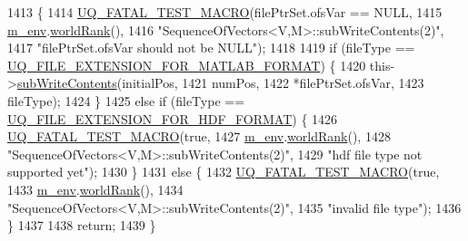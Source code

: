 \begin{DoxyCode}
1413 \{
1414   \hyperlink{_defines_8h_a56d63d18d0a6d45757de47fcc06f574d}{UQ\_FATAL\_TEST\_MACRO}(filePtrSet.ofsVar == NULL,
1415                       \hyperlink{class_q_u_e_s_o_1_1_base_vector_sequence_a8e8824d2a63c5a43bcc6473e3a0491e8}{m\_env}.\hyperlink{class_q_u_e_s_o_1_1_base_environment_a78b57112bbd0e6dd0e8afec00b40ffa7}{worldRank}(),
1416                       \textcolor{stringliteral}{"SequenceOfVectors<V,M>::subWriteContents(2)"},
1417                       \textcolor{stringliteral}{"filePtrSet.ofsVar should not be NULL"});
1418 
1419   \textcolor{keywordflow}{if} (fileType == \hyperlink{_defines_8h_ac440026eff7deb1c1eed1eea0e8e36ba}{UQ\_FILE\_EXTENSION\_FOR\_MATLAB\_FORMAT}) \{
1420     this->\hyperlink{class_q_u_e_s_o_1_1_sequence_of_vectors_ab4342629e89ee72896cb844c54f821f3}{subWriteContents}(initialPos,
1421                            numPos,
1422                            *filePtrSet.ofsVar,
1423                            fileType);
1424   \}
1425   \textcolor{keywordflow}{else} \textcolor{keywordflow}{if} (fileType == \hyperlink{_defines_8h_a4ebcc075277d031eb97c90b9a45f4493}{UQ\_FILE\_EXTENSION\_FOR\_HDF\_FORMAT}) \{
1426     \hyperlink{_defines_8h_a56d63d18d0a6d45757de47fcc06f574d}{UQ\_FATAL\_TEST\_MACRO}(\textcolor{keyword}{true},
1427                         \hyperlink{class_q_u_e_s_o_1_1_base_vector_sequence_a8e8824d2a63c5a43bcc6473e3a0491e8}{m\_env}.\hyperlink{class_q_u_e_s_o_1_1_base_environment_a78b57112bbd0e6dd0e8afec00b40ffa7}{worldRank}(),
1428                         \textcolor{stringliteral}{"SequenceOfVectors<V,M>::subWriteContents(2)"},
1429                         \textcolor{stringliteral}{"hdf file type not supported yet"});
1430   \}
1431   \textcolor{keywordflow}{else} \{
1432     \hyperlink{_defines_8h_a56d63d18d0a6d45757de47fcc06f574d}{UQ\_FATAL\_TEST\_MACRO}(\textcolor{keyword}{true},
1433                         \hyperlink{class_q_u_e_s_o_1_1_base_vector_sequence_a8e8824d2a63c5a43bcc6473e3a0491e8}{m\_env}.\hyperlink{class_q_u_e_s_o_1_1_base_environment_a78b57112bbd0e6dd0e8afec00b40ffa7}{worldRank}(),
1434                         \textcolor{stringliteral}{"SequenceOfVectors<V,M>::subWriteContents(2)"},
1435                         \textcolor{stringliteral}{"invalid file type"});
1436   \}
1437 
1438   \textcolor{keywordflow}{return};
1439 \}
\end{DoxyCode}
